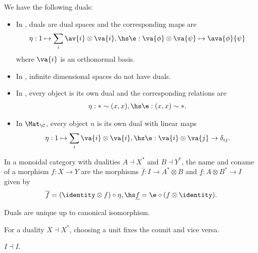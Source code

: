 \documentclass{article}
\begin{document}
\begin{example}
  We have the following duals:
  \begin{itemize}
    \item In \FHilb, duals are dual spaces and the corresponding maps are
      \begin{align*}
        \eta : 1 \mapsto \sum_i \av{i}\otimes\va{i},\hs
        \e : \va{\phi}\otimes\va{\psi}\mapsto\ava{\phi}{\psi}
      \end{align*}
      where $\va{i}$ is an orthonormal basis.
    \item In \Hilb, infinite dimensional spaces do not have duals.
    \item In \Rel, every object is its own dual and the corresponding relations
      are
      \begin{align*}
        \eta : * \sim (x,x),\hs
        \e : (x,x)\sim *.
      \end{align*}
    \item In $\Mat_{\C}$, every object $n$ is its own dual with linear maps
      \begin{align*}
        \eta : 1 \mapsto \sum_i \va{i}\otimes\va{i}, \hs
        \e : \va{i}\otimes\va{j}\to \delta_{ij}.
      \end{align*}
  \end{itemize}
\end{example}

\begin{definition}
  In a monoidal category with dualities $A\dashv X^*$ and $B\dashv Y^*$,
  the name and coname of a morphism $f:X\to Y$ are
  the morphisms $\overline f : I \to A^* \otimes B$ and
  $\underline f : A\otimes B^* \to I$ given by
  \begin{align*}
    \overline f = (\identity\otimes f)\circ\eta,\hs
    \underline f = \e \circ (f\otimes\identity).
  \end{align*}
\end{definition}

\begin{lemma}
  Duals are unique up to canonical isomorphism.
\end{lemma}

\begin{lemma}
  For a duality $X\dashv X^*$, choosing a unit fixes the counit and vice versa.
\end{lemma}

\begin{lemma}
  $I\dashv I$.
\end{lemma}
\end{document}
